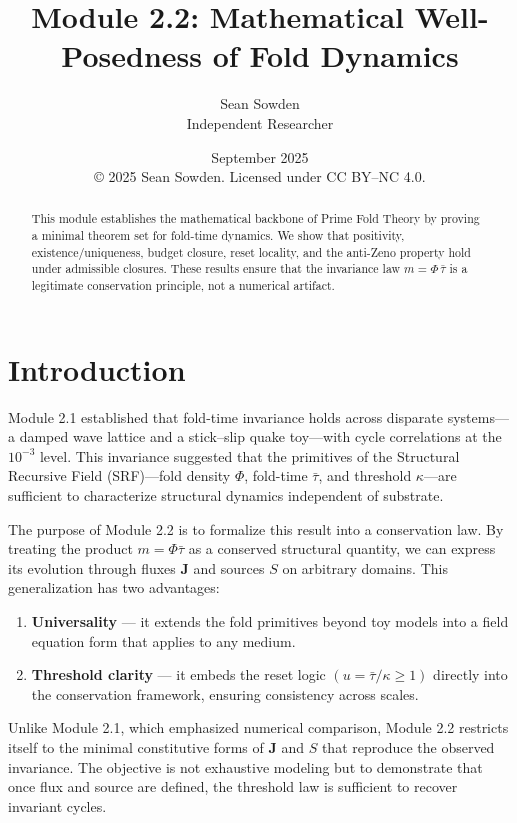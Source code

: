 \documentclass[11pt]{article}
\title{Module 2.2: Mathematical Well-Posedness of Fold Dynamics}
\author{Sean Sowden \\ Independent Researcher}
\date{September 2025 \\[1ex]
© 2025 Sean Sowden. Licensed under CC BY--NC 4.0.}
\begin{document}
\maketitle
\begin{abstract}
This module establishes the mathematical backbone of Prime Fold Theory by 
proving a minimal theorem set for fold-time dynamics. We show that positivity,
existence/uniqueness, budget closure, reset locality, and the anti-Zeno property 
hold under admissible closures. %
These results ensure that the invariance law $m = \Phi\, \bar{\tau}$ is a legitimate conservation principle, not a numerical artifact.

\end{abstract}

\tableofcontents
\newpage

\section{Introduction}
Module 2.1 established that fold-time invariance holds across disparate systems---a damped wave lattice and a stick--slip quake toy---with cycle correlations at the $10^{-3}$ level. This invariance suggested that the primitives of the Structural Recursive Field (SRF)---fold density $\Phi$, fold-time $\bar{\tau}$, and threshold $\kappa$---are sufficient to characterize structural dynamics independent of substrate.

The purpose of Module 2.2 is to formalize this result into a conservation law. By treating the product $m = \Phi \bar{\tau}$ as a conserved structural quantity, we can express its evolution through fluxes $\mathbf{J}$ and sources $S$ on arbitrary domains. This generalization has two advantages:

\begin{enumerate}
    \item \textbf{Universality} --- it extends the fold primitives beyond toy models into a field equation form that applies to any medium.
    \item \textbf{Threshold clarity} --- it embeds the reset logic $(u = \bar{\tau}/\kappa \geq 1)$ directly into the conservation framework, ensuring consistency across scales.
\end{enumerate}

Unlike Module 2.1, which emphasized numerical comparison, Module 2.2 restricts itself to the minimal constitutive forms of $\mathbf{J}$ and $S$ that reproduce the observed invariance. The objective is not exhaustive modeling but to demonstrate that once flux and source are defined, the threshold law is sufficient to recover invariant cycles.
\end{document}
